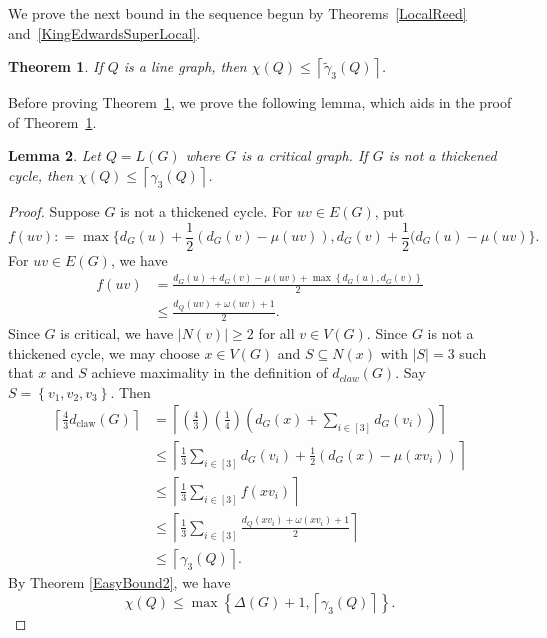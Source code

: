 \documentclass[12pt]{article}
\theoremstyle{plain}
\newtheorem{thm}{Theorem}
\newtheorem{lem}[thm]{Lemma}
\theoremstyle{definition}
\theoremstyle{remark}
\newcommand{\set}[1]{\left\{ #1 \right\}}
\newcommand{\card}[1]{\left|#1\right|}
\newcommand{\ceil}[1]{\left\lceil#1\right\rceil}
\newcommand{\irange}[1]{\left[#1\right]}
\newcommand{\parens}[1]{\left( #1 \right)}
\newcommand{\DefinedAs}{\mathrel{\mathop:}=}
\newcommand{\dclaw}[1]{d_{\text{claw}}\left( #1 \right)}
\begin{document}
We prove the next bound in the sequence begun by Theorems~\ref{LocalReed}
and~\ref{KingEdwardsSuperLocal}.  
\begin{thm}\label{SuperDuperLocalReed}
If $Q$ is a line graph, then $\chi(Q) \le \ceil{\tilde{\gamma}_3(Q)}$.
\end{thm}

Before proving Theorem~\ref{SuperDuperLocalReed}, we prove the following lemma,
which aids in the proof of Theorem~\ref{SuperDuperLocalReed}.

\begin{lem}\label{SuperDuperLocalReedHelper}
Let $Q = L(G)$ where $G$ is a critical graph. If $G$ is not a thickened cycle, then $\chi(Q) \le \ceil{\gamma_3(Q)}$.
\end{lem}
\begin{proof}
Suppose $G$ is not a thickened cycle. For $uv\in E(G)$, put 
\[f(uv) \DefinedAs \max\{d_G(u)+\frac12(d_G(v)-\mu(uv)),d_G(v)+\frac12(d_G(u)-\mu(uv)\}.\]
For $uv \in E(G)$, we have
\begin{align*}
f(uv) &= \frac{d_G(u) + d_G(v) - \mu(uv) + \max\set{d_G(u), d_G(v)}}{2}\\
&\le \frac{d_Q(uv) + \omega(uv) + 1}{2}.
\end{align*}
Since $G$ is critical, we have $\card{N(v)} \ge 2$ for all $v \in V(G)$.  
Since $G$ is not a thickened cycle, we may choose $x\in V(G)$ and $S\subseteq
N(x)$ with $\card{S} = 3$ such that $x$ and $S$ achieve maximality in the definition of $d_{claw}(G)$. 
Say $S = \set{v_1, v_2, v_3}$.  Then
\begin{align*}
\ceil{\frac43\dclaw{G}} &= \ceil{\parens{\frac43}\parens{\frac14}\parens{d_G(x)+\sum_{i \in \irange{3}} d_G(v_i)}} \\
&\le \ceil{\frac13\sum_{i \in \irange{3}} d_G(v_i) + \frac12(d_G(x) - \mu(xv_i))}\\
&\le \ceil{\frac13\sum_{i \in \irange{3}} f(xv_i)}\\
&\le \ceil{\frac13\sum_{i \in \irange{3}} \frac{d_Q(xv_i) + \omega(xv_i) + 1}{2}}\\
&\le \ceil{\gamma_3(Q)}.
\end{align*}
By Theorem \ref{EasyBound2}, we have
\begin{equation}\label{EasyBoundEquation}
\chi(Q) \le \max\set{\Delta(G) + 1, \ceil{\gamma_3(Q)}}.
\end{equation}


\end{proof}
\end{document}
